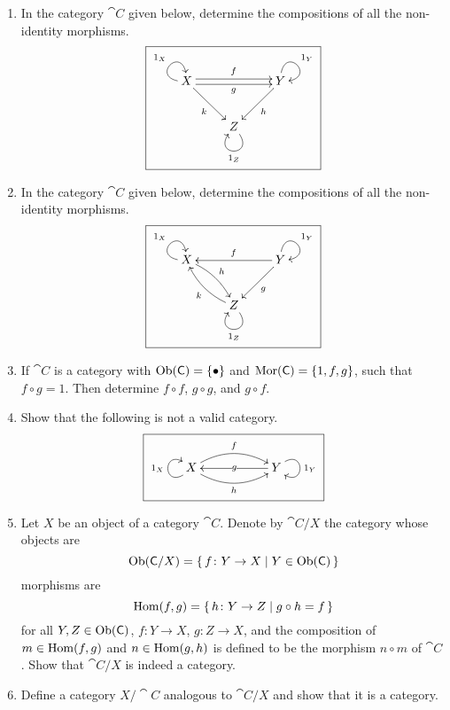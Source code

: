\begin{Exercise}
\begin{enumerate}
\item In the category $\cat C$ given below, determine the compositions of all the non-identity morphisms.
\begin{equation*}
\boxed{\xymatrix{
	X \ar @(l, u)^{1_X} \ar @<+0.5ex>[rr]^f \ar @<-0.5ex>[rr]_g  \ar [dr]_k && Y \ar @(u, r)^{1_Y}  \ar[ld]^h \\
	& Z \ar @(dr, dl)^{1_Z} 
}}
\end{equation*}

\item In the category $\cat C$ given below, determine the compositions of all the non-identity morphisms.
\begin{equation*}
\boxed{\xymatrix{
	X \ar @(l, u)^{1_X} \ar @/^/[dr]^h && Y \ar @(u, r)^{1_Y} \ar[ll]_f \ar[ld]^g \\
	& Z \ar @(dr, dl)^{1_Z} \ar @/^/[ul]^k
}}
\end{equation*}

\item If $\cat C$ is a category with $\operatorname{Ob}(\mathsf{C}) = \{ \bullet \}$ and $\operatorname{Mor}(\mathsf{C}) = \{1, f, g\}$, such that $f \circ g = 1$. Then determine $f \circ f$, $g \circ g$, and $g \circ f$.

\item Show that the following is not a valid category.
\begin{equation*}
\boxed{\xymatrix{
	X \ar @(ld, lu)^{1_X} \ar  @/^1pc/[rr]^f  \ar  @/_1pc/[rr]_h && Y \ar @(ru, rd)^{1_Y}  \ar[ll]|-g
}}
\end{equation*}

\item Let $X$ be an object of a category $\cat C$. Denote by $\cat C / X$ the category whose objects are
\begin{equation*}
\operatorname{Ob}(\mathsf{C} / X) = \qty{\, f \colon Y \to X \mid Y \in \operatorname{Ob}(\mathsf{C}) \,}
\end{equation*}
morphisms are
\begin{equation*}
\operatorname{Hom}(f, g) = \qty{\, h \colon Y \to Z \mid g \circ h = f \,}
\end{equation*}
for all $Y, Z \in \operatorname{Ob}(\mathsf{C})$, $f \colon Y \to X$, $g \colon Z \to X$, and the composition of $m \in \operatorname{Hom}(f, g)$ and $n \in \operatorname{Hom}(g, h)$ is defined to be the morphism $n \circ m$ of $\cat C$ . Show that $\cat C / X$ is indeed a category.

\item Define a category $X / \cat C$ analogous to $\cat C / X$ and show that it is a category.


\end{enumerate}
\end{Exercise}

